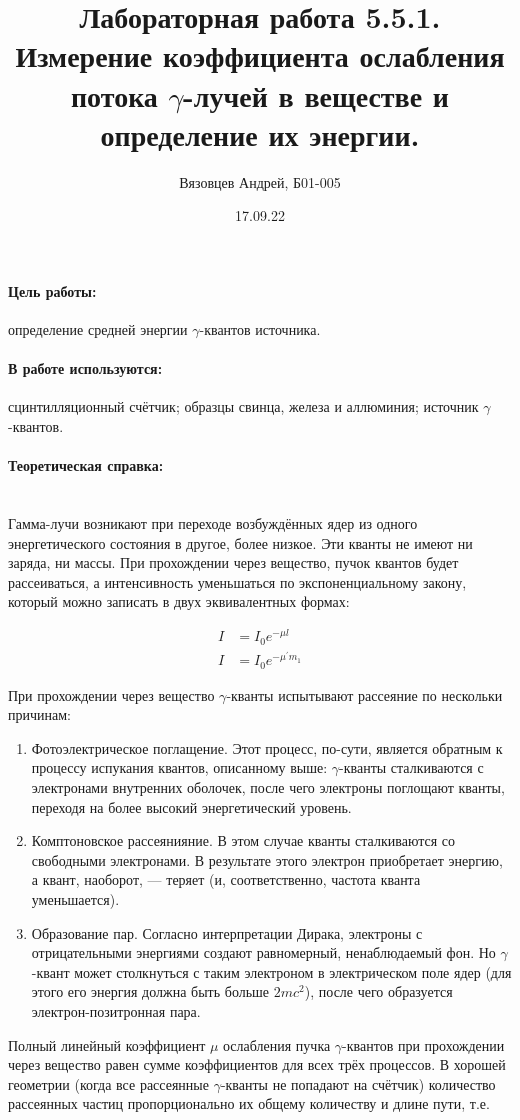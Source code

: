 \documentclass[a4paper, 12pt]{article}
\author{Вязовцев Андрей, Б01-005}
\date{17.09.22}
\title{Лабораторная работа 5.5.1. Измерение коэффициента ослабления потока $\gamma$-лучей в веществе и определение их энергии.}
\newcommand{\parag}[1]{\paragraph*{#1:}}
\begin{document}
\maketitle

\parag {Цель работы} определение средней энергии $\gamma$-квантов источника.

\parag {В работе используются} сцинтилляционный счётчик; образцы свинца, железа и аллюминия; источник $\gamma$-квантов.

\parag {Теоретическая справка} ~\\

Гамма-лучи возникают при переходе возбуждённых ядер из одного энергетического состояния в другое, более низкое. Эти кванты не имеют ни заряда, ни массы. При прохождении через вещество, пучок квантов будет рассеиваться, а интенсивность уменьшаться по экспоненциальному закону, который можно записать в двух эквивалентных формах:

\begin{align}
    I &= I_0 e^{-\mu l}  \label{eq:int} \\ 
    I &= I_0 e^{-\mu^\prime m_1}
\end{align}

При прохождении через вещество $\gamma$-кванты испытывают рассеяние по нескольки причинам:

\begin{enumerate}
    \item Фотоэлектрическое поглащение. Этот процесс, по-сути, является обратным к процессу испукания квантов, описанному выше: $\gamma$-кванты сталкиваются с электронами внутренних оболочек, после чего электроны поглощают кванты, переходя на более высокий энергетический уровень.
    \item Комптоновское рассеянияние. В этом случае кванты сталкиваются со свободными электронами. В результате этого электрон приобретает энергию, а квант, наоборот, --- теряет (и, соответственно, частота кванта уменьшается).
    \item Образование пар. Согласно интерпретации Дирака, электроны с отрицательными энергиями создают равномерный, ненаблюдаемый фон. Но $\gamma$-квант может столкнуться с таким электроном в электрическом поле ядер (для этого его энергия должна быть больше $2mc^2$), после чего образуется электрон-позитронная пара.
\end{enumerate}

Полный линейный коэффициент $\mu$ ослабления пучка $\gamma$-квантов при прохождении через вещество равен сумме коэффициентов для всех трёх процессов. В хорошей геометрии (когда все рассеянные $\gamma$-кванты не попадают на счётчик) количество рассеянных частиц пропорционально их общему количеству и длине пути, т.е.
\end{document}
